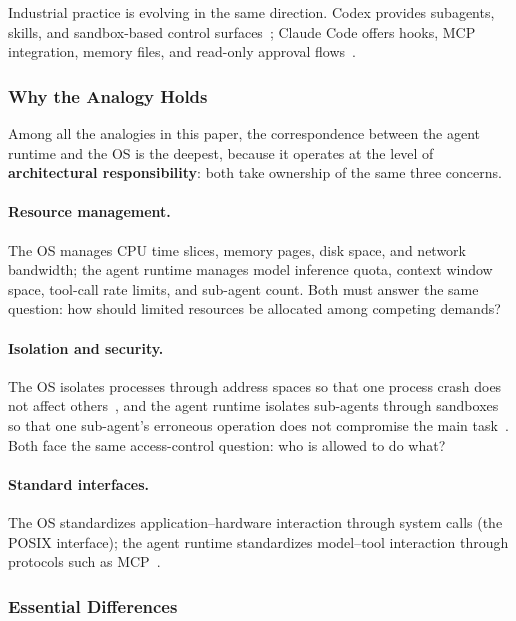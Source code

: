 Industrial practice is evolving in the same direction.
Codex provides subagents, skills, and sandbox-based control surfaces~\cite{openai_codex_overview_2026}; Claude Code offers hooks, MCP integration, memory files, and read-only approval flows~\cite{anthropic_claudecode_overview_2026}.

\subsubsection{Why the Analogy Holds}

Among all the analogies in this paper, the correspondence between the agent runtime and the OS is the deepest, because it operates at the level of \textbf{architectural responsibility}: both take ownership of the same three concerns.

\paragraph{Resource management.}
The OS manages CPU time slices, memory pages, disk space, and network bandwidth; the agent runtime manages model inference quota, context window space, tool-call rate limits, and sub-agent count.
Both must answer the same question: how should limited resources be allocated among competing demands?

\paragraph{Isolation and security.}
The OS isolates processes through address spaces so that one process crash does not affect others~\cite{ostep_2023}, and the agent runtime isolates sub-agents through sandboxes so that one sub-agent's erroneous operation does not compromise the main task~\cite{openai_codex_sandbox_2026,anthropic_claudecode_sandbox_2026}.
Both face the same access-control question: who is allowed to do what?

\paragraph{Standard interfaces.}
The OS standardizes application--hardware interaction through system calls (the POSIX interface); the agent runtime standardizes model--tool interaction through protocols such as MCP~\cite{mcp_intro_2026}.

\subsubsection{Essential Differences}


